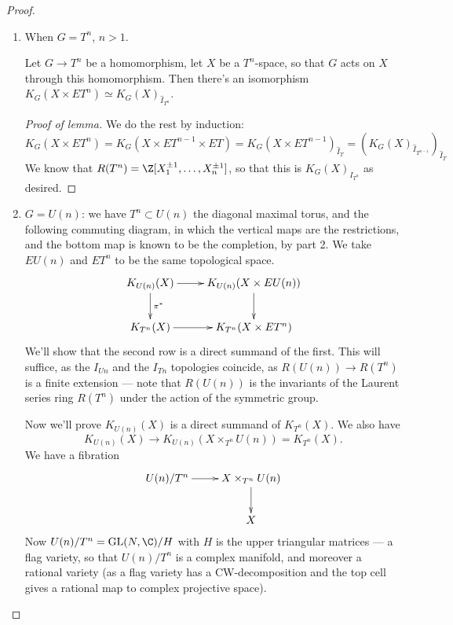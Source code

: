 \documentclass[11pt]{article}
\begin{document}
\begin{GuozhenEqKthy}
\begin{proof}
\begin{enumerate}
\begin{proof}[Proof of lemma]
In the special case $\varprojlim^1$ vanishes and the $\varprojlim$ vanishes (by finite module over noetherian ring-ness), so $K_G(X\times S^\infty)\cong \varprojlim K_G(X\times S^{2n-1})$. But the inverse limit of the third terms vanishes. [Get ML because of finiteness]
\end{proof}
\item When $G=T^n$, $n>1$.
\begin{lem*}
Let $G\to T^n$ be a homomorphism, let $X$ be a $T^n$-space, so that $G$ acts on $X$ through this homomorphism. Then there's an isomorphism $K_G(X\times ET^n)\simeq K_G(X)_{\hat I_{T^n}}$.
\end{lem*}
\begin{proof}[Proof of lemma]
We do the rest by induction:
\[K_G(X\times ET^n)=K_G(X\times ET^{n-1}\times ET)=K_G(X\times ET^{n-1})_{\hat I_T}=(K_G(X)_{\hat I_{T^{n-1}}})_{\hat I_{T}}\]
We know that $R(T^n)=\Z[X_1^{\pm1},\ldots,X_n^{\pm1}]$, so that
this is $K_G(X)_{I_{T^n}}$ as desired.
\end{proof}
\item $G=U(n)$: we have $T^n\subset U(n)$ the diagonal maximal torus, and the following commuting diagram, in which the vertical maps are the restrictions, and the bottom map is known to be the completion, by part 2. We take $EU(n)$ and $ET^n$ to be the same topological space.
\[\xymatrix{
K_{U(n)}(X)\ar[r]\ar[d]^{\pi^*}& K_{U(n)}(X\times EU(n))\ar[d]\\
\ar[r]K_{T^n}(X)&K_{T^n}(X\times ET^n)
}\]
We'll show that the second row is a direct summand of the first. This will suffice, as the $I_{Un}$ and the $I_{Tn}$ topologies coincide, as $R(U(n))\to R(T^n)$ is a finite extension --- note that $R(U(n))$ is the invariants of the Laurent series ring $R(T^n)$ under the action of the symmetric group.

Now we'll prove $K_{U(n)}(X)$ is a direct summand of $K_{T^n}(X)$. We also have
\[K_{U(n)}(X)\to K_{U(n)}(X\times_{T^n} U(n))=K_{T^n}(X).\]  
We have a fibration
\[\xymatrix{U(n)/T^n\ar[r]&X\times_{T^n}U(n)\ar[d]\\
&X}\]
Now $U(n)/T^n=\GL(N,\C)/H$ with $H$ is the upper triangular matrices --- a flag variety, so that $U(n)/T^n$ is a complex manifold, and moreover a rational variety (as a flag variety has a CW-decomposition and the top cell gives a rational map to complex projective space).



\end{enumerate}
\end{proof}
\end{GuozhenEqKthy}
\end{document}
